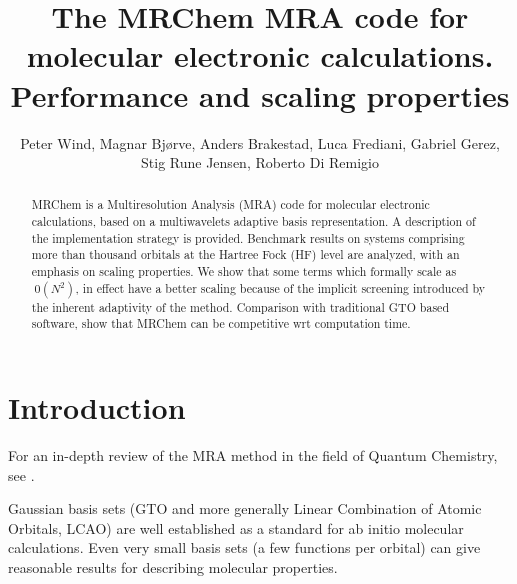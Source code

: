 \documentclass{article}
\begin{document}


\title{The MRChem MRA code for molecular electronic calculations. Performance and scaling properties}

\author{Peter Wind, Magnar Bjørve, Anders Brakestad, Luca Frediani, Gabriel Gerez, Stig Rune Jensen, Roberto Di Remigio}


\maketitle

\begin{abstract}
MRChem is a Multiresolution Analysis (MRA) code for molecular electronic calculations, based on a multiwavelets adaptive basis representation. A description of the implementation strategy is provided. Benchmark results on systems comprising more than thousand orbitals at the Hartree Fock (HF) level are analyzed, with an emphasis on scaling properties. 
We show that some terms which formally scale as $~0(N^2)$, in effect have a better scaling because of the implicit screening introduced by the inherent adaptivity of the method. Comparison with traditional GTO based software, show that MRChem can be competitive wrt computation time.

\end{abstract}


\section{Introduction}

For an in-depth review of the MRA method in the field of Quantum Chemistry, see \citep[]{bischoff2019}.

Gaussian basis sets (GTO and more generally Linear Combination of Atomic Orbitals, LCAO) are well established as a standard for ab initio molecular calculations. 
Even very small basis sets (a few functions per orbital) can give reasonable results for describing molecular properties. 

\end{document}
